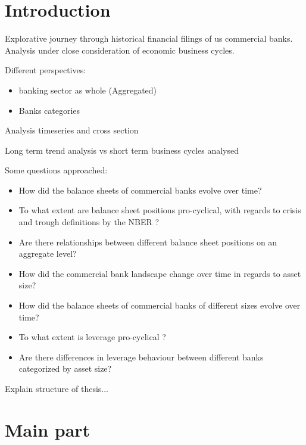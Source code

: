 \documentclass[12pt, a4paper]{article} %
\begin{document}
\tableofcontents
\newpage
{}




\section{Introduction}

Explorative journey through historical financial filings of us commercial banks.
Analysis under close consideration of economic business cycles.   

Different perspectives: 
\begin{itemize}
\item banking sector as whole (Aggregated)
\item Banks categories
\end{itemize}

Analysis timeseries and cross section

Long term trend analysis vs short term business cycles analysed

Some questions approached: 
\begin{itemize}
\item How did the balance sheets of commercial banks evolve over time?
\item To what extent are balance sheet positions pro-cyclical, with regards to crisis and trough definitions by the NBER ?
\item Are there relationships between different balance sheet positions on an aggregate level?
\item How did the commercial bank landscape change over time in regards to asset size?
\item How did the balance sheets of commercial banks of different sizes evolve over time?
\item To what extent is leverage pro-cyclical ?
\item Are there differences in leverage behaviour between different banks categorized by asset size?
\end{itemize}

Explain structure of thesis...

\section{Main part}
\end{document}
